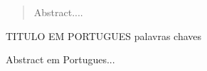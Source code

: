 

\begin{abstract}
Abstract....
\end{abstract}

\begin{englishabstract}
{TITULO EM PORTUGUES}
{palavras chaves}

Abstract em Portugues...


\end{englishabstract}



